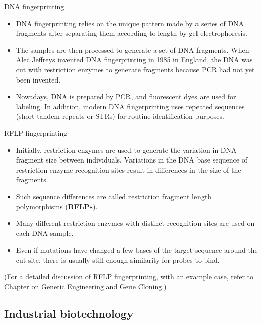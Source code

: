 \documentclass[
  ignorenonframetext,
  aspectratio=169]{beamer}
\providecommand{\tightlist}{%
  \setlength{\itemsep}{0pt}\setlength{\parskip}{0pt}}
\begin{document}
\begin{frame}{DNA fingerprinting}
\protect\hypertarget{dna-fingerprinting}{}
\begin{itemize}
\tightlist
\item
  DNA fingerprinting relies on the unique pattern made by a series of
  DNA fragments after separating them according to length by gel
  electrophoresis.
\item
  The samples are then processed to generate a set of DNA fragments.
  When Alec Jeffreys invented DNA fingerprinting in 1985 in England, the
  DNA was cut with restriction enzymes to generate fragments because PCR
  had not yet been invented.
\item
  Nowadays, DNA is prepared by PCR, and fluorescent dyes are used for
  labeling. In addition, modern DNA fingerprinting uses repeated
  sequences (short tandem repeats or STRs) for routine identification
  purposes.
\end{itemize}
\end{frame}

\begin{frame}{RFLP fingerprinting}
\protect\hypertarget{rflp-fingerprinting}{}
\begin{itemize}
\tightlist
\item
  Initially, restriction enzymes are used to generate the variation in
  DNA fragment size between individuals. Variations in the DNA base
  sequence of restriction enzyme recognition sites result in differences
  in the size of the fragments.
\item
  Such sequence differences are called restriction fragment length
  polymorphisms (\textbf{RFLPs}).
\item
  Many different restriction enzymes with distinct recognition sites are
  used on each DNA sample.
\item
  Even if mutations have changed a few bases of the target sequence
  around the cut site, there is usually still enough similarity for
  probes to bind.
\end{itemize}

(For a detailed discussion of RFLP fingerprinting, with an example case,
refer to Chapter on Genetic Engineering and Gene Cloning.)
\end{frame}

\hypertarget{industrial-biotechnology}{%
\subsection{Industrial biotechnology}\label{industrial-biotechnology}}
\end{document}
